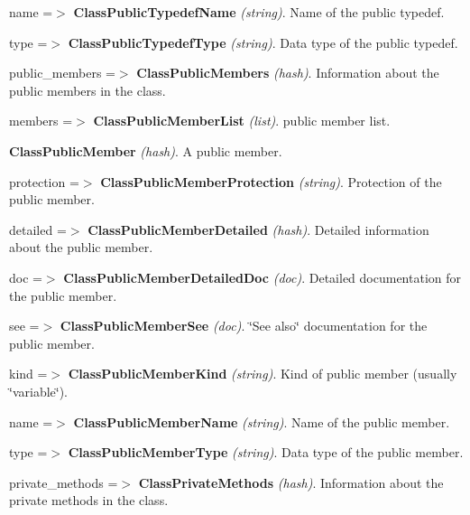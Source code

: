 \begin{DoxyItemize}
\begin{DoxyItemize}
\begin{DoxyItemize}
\begin{DoxyItemize}
\begin{DoxyItemize}
\begin{DoxyItemize}
\begin{DoxyItemize}
\item name =$>$ {\bfseries ClassPublicTypedefName} {\itshape (string)\/}. Name of the public typedef. 
\item type =$>$ {\bfseries ClassPublicTypedefType} {\itshape (string)\/}. Data type of the public typedef. 
\end{DoxyItemize}
\end{DoxyItemize}
\end{DoxyItemize}
\item public\_\-members =$>$ {\bfseries ClassPublicMembers} {\itshape (hash)\/}. Information about the public members in the class. 
\begin{DoxyItemize}
\item members =$>$ {\bfseries ClassPublicMemberList} {\itshape (list)\/}. public member list. 
\begin{DoxyItemize}
\item {\bfseries ClassPublicMember} {\itshape (hash)\/}. A public member. 
\begin{DoxyItemize}
\item protection =$>$ {\bfseries ClassPublicMemberProtection} {\itshape (string)\/}. Protection of the public member. 
\item detailed =$>$ {\bfseries ClassPublicMemberDetailed} {\itshape (hash)\/}. Detailed information about the public member. 
\begin{DoxyItemize}
\item doc =$>$ {\bfseries ClassPublicMemberDetailedDoc} {\itshape (doc)\/}. Detailed documentation for the public member. 
\item see =$>$ {\bfseries ClassPublicMemberSee} {\itshape (doc)\/}. \char`\"{}See also\char`\"{} documentation for the public member. 
\end{DoxyItemize}
\item kind =$>$ {\bfseries ClassPublicMemberKind} {\itshape (string)\/}. Kind of public member (usually \char`\"{}variable\char`\"{}). 
\item name =$>$ {\bfseries ClassPublicMemberName} {\itshape (string)\/}. Name of the public member. 
\item type =$>$ {\bfseries ClassPublicMemberType} {\itshape (string)\/}. Data type of the public member. 
\end{DoxyItemize}
\end{DoxyItemize}
\end{DoxyItemize}
\item private\_\-methods =$>$ {\bfseries ClassPrivateMethods} {\itshape (hash)\/}. Information about the private methods in the class. 

\end{DoxyItemize}
\end{DoxyItemize}
\end{DoxyItemize}
\end{DoxyItemize}
